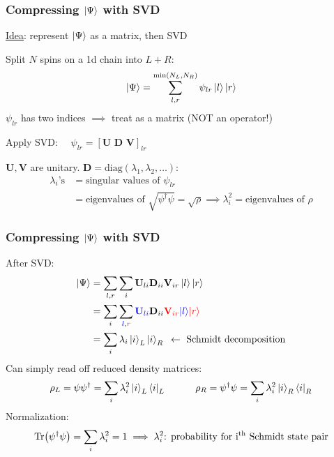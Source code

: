 \documentclass{beamer}
\theoremstyle{definition}
\begin{document}
\begin{frame}
	\frametitle{Compressing $\ket{\Psi}$ with SVD}
	\underline{Idea}: represent $\ket{\Psi}$ as a matrix, then SVD\\
	
	\vspace{8pt}
	
	Split $N$ spins on a 1d chain into $L+R$: 
	\begin{align*}
		\ket{\Psi} = \sum_{l,r}^{\min(N_L,N_R)} \psi_{lr} \ket{l}\ket{r}
	\end{align*}
	$\psi_{lr}$ has two indices $\implies$ treat as a matrix (NOT an operator!) \\ 
	
	\vspace{8pt} 
	
	Apply SVD: $\quad\psi_{lr} = [\mathbf{U}\,\,\mathbf{D}\,\,\mathbf{V}]_{lr}$\\
	
	\vspace{8pt}
	
	$\mathbf{U}, \mathbf{V}$ are unitary. $\mathbf{D} = \text{diag}(\lambda_1,\lambda_2,\dots)$:
	\begin{align*}
		\lambda_i\text{'s} 
		&= \text{singular values of } \psi_{lr} \\
		&= \text{eigenvalues of } \sqrt{\psi^\dagger\psi} = \sqrt{\rho} \implies \lambda_i^2 = \text{eigenvalues of } \rho
	\end{align*}
	
\end{frame}


\begin{frame}
	\frametitle{Compressing $\ket{\Psi}$ with SVD}
	
	After SVD:
	\begin{align*}
		\ket{\Psi} &= \sum_{l,r} \sum_{i} \mathbf{U}_{li}\mathbf{D}_{ii} \mathbf{V}_{ir} \ket{l}\ket{r}\\
		&= \sum_{i} \sum_{\textcolor{blue}{l},\textcolor{red}{r}}  \textcolor{blue}{\mathbf{U}_{li}}\mathbf{D}_{ii} \textcolor{red}{\mathbf{V}_{ir} } \textcolor{blue}{\ket{l}}\textcolor{red}{\ket{r}}\\
		&= \sum_i \lambda_i \ket{i}_L \ket{i}_R \,\,\,\leftarrow \text{ Schmidt decomposition}
	\end{align*}
	Can simply read off reduced density matrices:
	\begin{align*}
		\rho_L = \psi\psi^\dagger = \sum_i \lambda_i^2 \ket{i}_L \bra{i}_L \quad\quad\quad \rho_R = \psi^\dagger\psi = \sum_i \lambda_i^2 \ket{i}_R \bra{i}_R
	\end{align*}
	Normalization:
	\begin{align*}
		\Tr(\psi^\dagger\psi) = \sum_i \lambda_i^2 = 1 \implies \lambda_i^2 \text{: probability for i$^\text{th}$ Schmidt state pair}
	\end{align*}
\end{frame}
\end{document}
